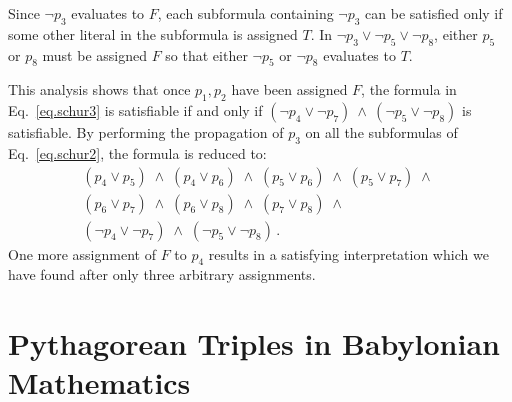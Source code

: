 Since $\neg p_3$ evaluates to $F$, each subformula containing $\neg p_3$ can be satisfied only if some other literal in the subformula is assigned $T$. In $\neg p_3 \vee \neg p_5 \vee \neg p_8$, either $p_5$ or $p_8$ must be assigned $F$ so that either $\neg p_5$ or $\neg p_8$ evaluates to $T$.

This analysis shows that once $p_1,p_2$ have been assigned $F$, the formula in Eq.~\ref{eq.schur3} is satisfiable if and only if $(\neg p_4 \vee \neg p_7) \:\wedge\: (\neg p_5 \vee \neg p_8)$ is satisfiable. By performing the propagation of $p_3$ on all the subformulas of Eq.~\ref{eq.schur2}, the formula is reduced to:
\[
\begin{array}{l}
(p_4\vee p_5)\;\wedge\;(p_4\vee p_6)\;\wedge\;(p_5\vee p_6)\;\wedge\;(p_5\vee p_7)\;\wedge\;\\
(p_6\vee p_7)\;\wedge\;(p_6\vee p_8)\;\wedge\;(p_7\vee p_8)\;\wedge\\
(\neg p_4\vee \neg p_7)\;\wedge\;
(\neg p_5\vee \neg p_8)\,.
\end{array}
\]
One more assignment of $F$ to $p_4$ results in a satisfying interpretation which we have found after only three arbitrary assignments.


\section{Pythagorean Triples in Babylonian Mathematics}\label{s.plimpton}

